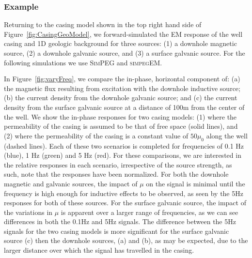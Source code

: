 \documentclass{segabs}
\newcommand{\SimPEG}{\textsc{SimPEG}\xspace}
\newcommand{\simpegEM}{\textsc{simpegEM}\xspace}
\begin{document}
\subsubsection{Example}
Returning to the casing model shown in the top right hand side of Figure~\ref{fig:CasingGeoModel}, we forward-simulated the EM response of the well casing and 1D geologic background for three sources: (1) a downhole magnetic source, (2) a downhole galvanic source, and (3) a surface galvanic source. For the following simulations we use \SimPEG and \simpegEM \citep{SimPEG, SimPEGEM}. 

In Figure~\ref{fig:varyFreq}, we compare the in-phase, horizontal component of: (a) the magnetic flux resulting from excitation with the downhole inductive source; (b) the current density from the downhole galvanic source; and (c) the current density from the surface galvanic source at a distance of 100m from the center of the well. We show the in-phase responses for two casing models: (1) where the permeability of the casing is assumed to be that of free space (solid lines), and (2) where the permeability of the casing is a constant value of $50 \mu_0$ along the well (dashed lines). Each of these two scenarios is completed for frequencies of 0.1 Hz (blue), 1 Hz (green) and 5 Hz (red). For these comparisons, we are interested in the relative responses in each scenario, irrespective of the source strength, as such, note that the responses have been normalized. For both the downhole magnetic and galvanic sources, the impact of $\mu$ on the signal is minimal until the frequency is high enough for inductive effects to be observed, as seen by the 5Hz responses for both of these sources. For the surface galvanic source, the impact of the variations in $\mu$ is apparent over a larger range of frequencies, as we can see differences in both the 0.1Hz and 5Hz signals. The difference between the 5Hz signals for the two casing models is more significant for the surface galvanic source (c) then the downhole sources, (a) and (b), as may be expected, due to the larger distance over which the signal has travelled in the casing. 
\end{document}
